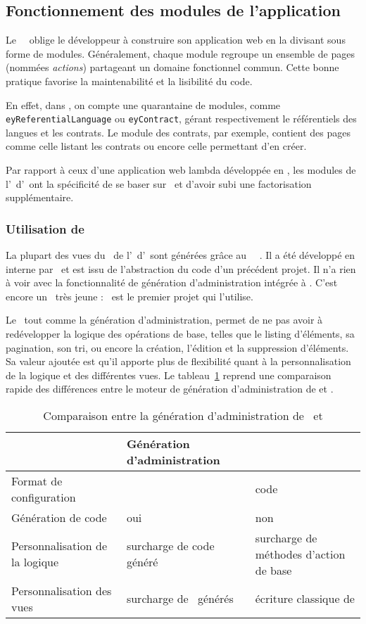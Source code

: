 \subsection{Fonctionnement des modules de l'application}

Le \afm\ \asf\ oblige le développeur à construire son application web en la divisant sous forme de modules. Généralement, chaque module regroupe un ensemble de pages (nommées \emph{actions}) partageant un domaine fonctionnel commun. Cette bonne pratique favorise la maintenabilité et la lisibilité du code.

En effet, dans \aey, on compte une quarantaine de modules, comme \texttt{ey\-Referential\-Language} ou \texttt{eyContract}, gérant respectivement le référentiels des langues et les contrats. Le module des contrats, par exemple, contient des pages comme celle listant les contrats ou encore celle permettant d'en créer.

Par rapport à ceux d'une application web lambda développée en \asf, les modules de l'\aintranet\ d'\aey\ ont la spécificité de se baser sur \asladmin\ et d'avoir subi une factorisation supplémentaire.


\subsubsection{Utilisation de \asladmin}

La plupart des vues du \alotdeux\ de l'\aintranet\ d'\aey\ sont générées grâce au \aplugin\ \asf\ \asladmin. Il a été développé en interne par \asl\ et est issu de l'abstraction du code d'un précédent projet. Il n'a rien à voir avec la fonctionnalité de génération d'administration intégrée à \asf. C'est encore un \aplugin\ très jeune : \aey\ est le premier projet qui l'utilise.

Le \aplugin\, tout comme la génération d'administration, permet de ne pas avoir à redévelopper la logique des opérations de base, telles que le listing d'éléments, sa pagination, son tri, ou encore la création, l'édition et la suppression d'éléments. Sa valeur ajoutée est qu'il apporte plus de flexibilité quant à la personnalisation de la logique et des différentes vues. Le tableau~\ref{table:eyrolles_sladmin_sladmin-vs-admin-gen} reprend une comparaison rapide des différences entre le moteur de génération d'administration de \asf et \asladmin.

\begin{table}
	\centering
	\begin{tabular}{|p{3cm}||p{4.5cm}|p{4.5cm}|}
		\hline
		& Génération d'administration & \asladmin\ \tabularnewline
		\hline
		\hline
		Format de configuration & \ayml & code \aphp \tabularnewline
		\hline
		Génération de code & oui & non \tabularnewline
		\hline
		Personnalisation de la logique & surcharge de code généré & surcharge de méthodes d'action de base \tabularnewline
		\hline
		Personnalisation des vues & surcharge de \apartials\ générés & écriture classique de \atemplates \tabularnewline
		\hline
	\end{tabular}
	\caption{Comparaison entre la génération d'administration de \asf\ et \asladmin}
	\label{table:eyrolles_sladmin_sladmin-vs-admin-gen}
\end{table}


